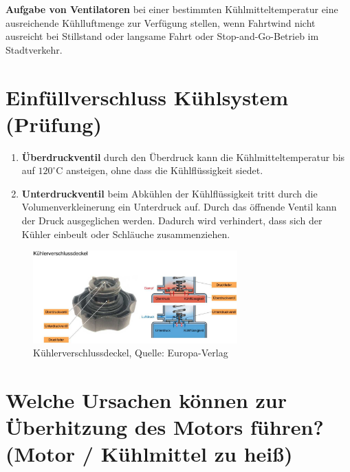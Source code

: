\textbf{Aufgabe von Ventilatoren} bei einer bestimmten
Kühlmitteltemperatur eine ausreichende Kühlluftmenge zur Verfügung
stellen, wenn Fahrtwind nicht ausreicht bei Stillstand oder langsame
Fahrt oder Stop-and-Go-Betrieb im Stadtverkehr.

\section{Einfüllverschluss Kühlsystem
(Prüfung)}\label{einfuellverschluss-kuehlsystem-pruefung}

\begin{enumerate}
\item
  \textbf{Überdruckventil} durch den Überdruck kann die
  Kühlmitteltemperatur bis auf $120^\circ\text{C}$ ansteigen, ohne
  dass die Kühlflüssigkeit siedet.
\item
  \textbf{Unterdruckventil} beim Abkühlen der Kühlflüssigkeit tritt
  durch die Volumenverkleinerung ein Unterdruck auf. Durch das öffnende
  Ventil kann der Druck ausgeglichen werden. Dadurch wird verhindert,
  dass sich der Kühler einbeult oder Schläuche zusammenziehen.
\end{enumerate}

\begin{figure}[!ht]%
\centering
\includegraphics[width=0.7\textwidth]{images/Kuehlsystem/Kuehlsystem-4.pdf}
\caption{Kühlerverschlussdeckel, Quelle: Europa-Verlag}
\end{figure}

\section{Welche Ursachen können zur Überhitzung des Motors führen?
(Motor / Kühlmittel zu
heiß)}\label{welche-ursachen-koennen-zur-ueberhitzung-des-motors-fuehren-motor-kuehlmittel-zu-heiss}

